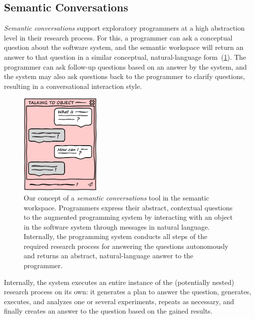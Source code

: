 \subsection{Semantic Conversations}
\label{sec:approach/workspace/conversations}

\emph{Semantic conversations} support exploratory programmers at a high abstraction level in their research process.
For this, a programmer can ask a conceptual question about the software system, and the semantic workspace will return an answer to that question in a similar conceptual, natural-language form~(\cref{fig:approach/workspace/conversation}).
The programmer can ask follow-up questions based on an answer by the system, and the system may also ask questions back to the programmer to clarify questions, resulting in a conversational interaction style.

\begin{figure}
	\centering
	\includegraphics[width=0.35\textwidth]{02_workspace/conversation.png}
	\caption[Our concept of a \emph{semantic conversations} tool in the semantic workspace.]{
		Our concept of a \emph{semantic conversations} tool in the semantic workspace.
		Programmers express their abstract, contextual questions to the augmented programming system by interacting with an object in the software system through messages in natural language.
		Internally, the programming system conducts all steps of the required research process for answering the questions autonomously and returns an abstract, natural-language answer to the programmer.
	}
	\label{fig:approach/workspace/conversation}
\end{figure}

Internally, the system executes an entire instance of the (potentially nested) research process on its own: it generates a plan to answer the question, generates, executes, and analyzes one or several experiments, repeats as necessary, and finally creates an answer to the question based on the gained results.

